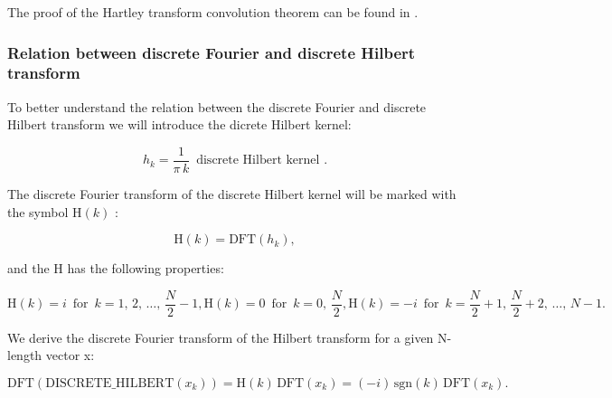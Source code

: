 \documentclass[12pt,twoside,a4paper]{article}
\numberwithin{equation}{subsection}
\numberwithin{figure}{subsection}
\begin{document}
The proof of the Hartley transform convolution theorem can be found in \cite{chang_computation}. 

\subsubsection*{Relation between discrete Fourier and discrete Hilbert transform}

To better understand the relation between the discrete Fourier and discrete Hilbert transform we will introduce the dicrete Hilbert kernel:

\begin{equation}   \label{eq:hdfttps_smallh}
	h_k = \frac {1}{\pi \, k} \, \mbox{ discrete Hilbert kernel } .  
\end{equation}

The discrete Fourier transform of the discrete Hilbert kernel will be marked with the symbol $\mathrm{H}(k)$ :

\begin{equation}   \label{eq:hdfttps_bigh}
    \mathrm{H}(k) = \mathrm{DFT}(h_k), 
\end{equation}

and the $\mathrm{H}$ has the following properties:

\begin{subequations} \label{eq:hartley_defh}
  \begin{equation}   \label{eq:hdefh_fhalf}
    \mathrm{H}(k) =  i \, \mbox{ for } \, k = 1, \, 2, \, \ldots, \, \frac {N}{2} - 1 ,
  \end{equation}
  \begin{equation}   \label{eq:hdefh_middle}
    \mathrm{H}(k) =  0 \, \mbox{ for } \, k = 0, \, \frac {N}{2} ,
  \end{equation}
  \begin{equation}   \label{eq:hdefh_shalf}
    \mathrm{H}(k) = -i \, \mbox{ for } \, k = \frac {N}{2} + 1, \, \frac {N}{2} + 2, \, \ldots, \, N - 1
  \end{equation} .
\end{subequations}

We derive the discrete Fourier transform of the Hilbert transform for a given N-length vector x:

\begin{equation} \label{eq:hartley_dfttheorem}
  \mathrm{DFT}(\mathrm{DISCRETE\_HILBERT}(x_k)) = 
  	\mathrm{H}(k) \, \mathrm{DFT}(x_k)  = ( - i) \, \mathrm{\text{sgn}}(k) \, \mathrm{DFT}(x_k) .
\end{equation}
\end{document}
